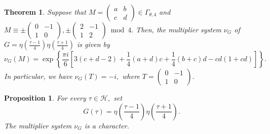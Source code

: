 \documentclass[10pt,a4paper]{amsart}
\newtheorem{proposition}{Proposition}
\newtheorem{theorem}{Theorem}
\begin{document}
\begin{theorem}
\label{thm:M:c-odd-level4}
{\it
Suppose that 
$
M=
\begin{pmatrix}
a & b \\
c & d
\end{pmatrix}
\in 
\Gamma_{\theta,4}
$ 
and 
$M\equiv 
\pm
\begin{pmatrix}
0 & -1 \\
1 & 0
\end{pmatrix}, 
 \pm
\begin{pmatrix}
2 & -1 \\
1 & 2
\end{pmatrix}
\bmod{4}. 
$ 
Then, 
the multiplier system 
$\nu_{G}$ of 
$
\displaystyle 
G=
\eta \left(\frac{\tau-1}{4} \right) \eta\left(\frac{\tau+1}{4} \right)
$ 
is given by 
\begin{equation*}
\nu_{G}
(M)
=
\exp
\left\{
\frac{\pi i}{6}
\left[
3(c+d-2)+\frac14(a+d)c
+
\frac14(b+c)d-cd(1+cd)
\right]
\right\}. 
\end{equation*}
In particular, we have $\nu_{G}(T)=-i,$ where 
$
T=
\begin{pmatrix}
0 & -1 \\
1 & 0
\end{pmatrix}.  
$
}
\end{theorem}

\begin{proposition}
\label{prop:character-level4}
{\it
For every $\tau\in\mathscr{H},$
set 
\begin{equation*}
G(\tau)= \eta \left(\frac{\tau-1}{4} \right) \eta\left(\frac{\tau+1}{4} \right).
\end{equation*}
The multiplier system $\nu_{G}$ is a character. 
}
\end{proposition}
\end{document}

